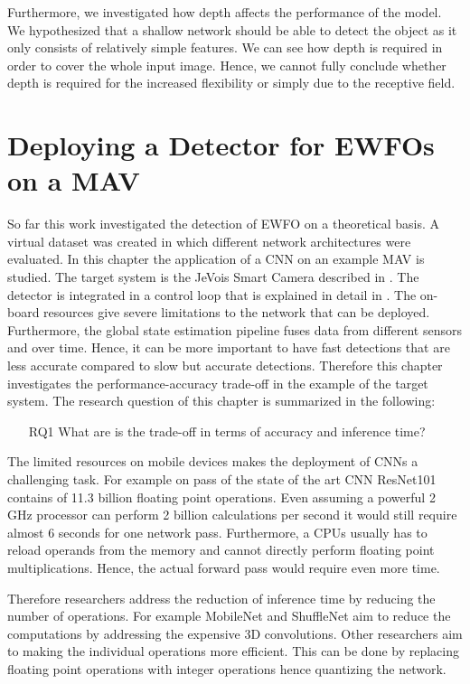 Furthermore, we investigated how depth affects the performance of the model. We hypothesized that a shallow network should be able to detect the object as it only consists of relatively simple features. We can see how depth is required in order to cover the whole input image. Hence, we cannot fully conclude whether depth is required for the increased flexibility or simply due to the receptive field. 


\section{Deploying a Detector for \acp{EWFO} on a \ac{MAV}}


So far this work investigated the detection of \ac{EWFO} on a theoretical basis. A virtual dataset was created in which different network architectures were evaluated. In this chapter the application of a \ac{CNN} on an example \ac{MAV} is studied. The target system is the JeVois Smart Camera described in . The detector is integrated in a control loop that is explained in detail in . The on-board resources give severe limitations to the network that can be deployed. Furthermore, the global state estimation pipeline fuses data from different sensors and over time. Hence, it can be more important to have fast detections that are less accurate compared to slow but accurate detections. Therefore this chapter investigates the performance-accuracy trade-off in the example of the target system. The research question of this chapter is summarized in the following:

\begin{itemize}
	\item[RQ1] What are is the trade-off in terms of accuracy and inference time?
\end{itemize}

The limited resources on mobile devices makes the deployment of \acp{CNN} a challenging task. For example on pass of the state of the art \ac{CNN} ResNet101 contains of 11.3 billion floating point operations. Even assuming a powerful 2 GHz processor can perform 2 billion calculations per second it would still require almost 6 seconds for one network pass. Furthermore, a \acp{CPU} usually has to reload operands from the memory and cannot directly perform floating point multiplications. Hence, the actual forward pass would require even more time.

Therefore researchers address the reduction of inference time by reducing the number of operations. For example MobileNet and ShuffleNet aim to reduce the computations by addressing the expensive 3D convolutions. Other researchers aim to making the individual operations more efficient. This can be done by replacing floating point operations with integer operations hence quantizing the network.

